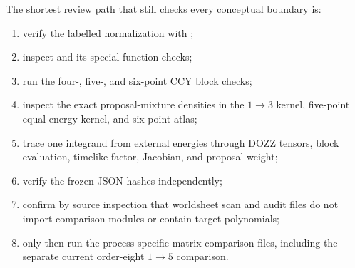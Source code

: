 \documentclass[11pt]{article}
\begin{document}
The shortest review path that still checks every conceptual boundary is:
\begin{enumerate}
  \item verify the labelled normalization with
  ;
  \item inspect  and its special-function checks;
  \item run the four-, five-, and six-point CCY block checks;
  \item inspect the exact proposal-mixture densities in the $1\to3$ kernel,
  five-point equal-energy kernel, and six-point atlas;
  \item trace one integrand from external energies through DOZZ tensors,
  block evaluation, timelike factor, Jacobian, and proposal weight;
  \item verify the frozen JSON hashes independently;
  \item confirm by source inspection that worldsheet scan and audit files do
  not import comparison modules or contain target polynomials;
  \item only then run the process-specific matrix-comparison files, including
  the separate current order-eight $1\to5$ comparison.
\end{enumerate}
\end{document}
